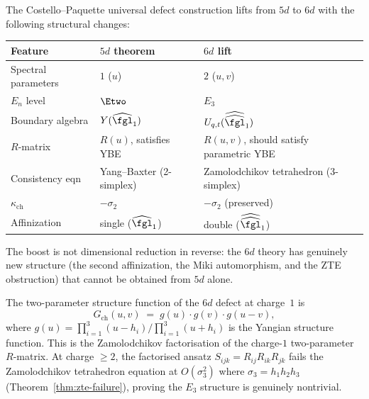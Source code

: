 \begin{conjecture}
\label{conj:cp-5d-to-6d-boost}
\ClaimStatusConjectured
The Costello--Paquette universal defect construction lifts from $5d$ to $6d$ with the following structural changes:
\begin{center}
\small
\renewcommand{\arraystretch}{1.2}
\begin{tabular}{lll}
\toprule
\textbf{Feature} & \textbf{$5d$ theorem} & \textbf{$6d$ lift} \\
\midrule
Spectral parameters & $1$ ($u$) & $2$ ($u, v$) \\
$E_n$ level & $\Etwo$ & $E_3$ \\
Boundary algebra & $Y(\widehat{\fgl}_1)$ & $U_{q,t}(\widehat{\widehat{\fgl}}_1)$ \\
$R$-matrix & $R(u)$, satisfies YBE & $R(u,v)$, should satisfy parametric YBE \\
Consistency eqn & Yang--Baxter (2-simplex) & Zamolodchikov tetrahedron (3-simplex) \\
$\kappa_{\mathrm{ch}}$ & $-\sigma_2$ & $-\sigma_2$ (preserved) \\
Affinization & single ($\widehat{\fgl}_1$) & double ($\widehat{\widehat{\fgl}}_1$) \\
\bottomrule
\end{tabular}
\end{center}
The boost is not dimensional reduction in reverse: the $6d$ theory has genuinely new structure (the second affinization, the Miki automorphism, and the ZTE obstruction) that cannot be obtained from $5d$ alone.

The two-parameter structure function of the $6d$ defect at charge~$1$ is
\begin{equation}\label{eq:cp-two-param-structure}
 G_{\mathrm{ch}}(u, v) \;=\; g(u) \cdot g(v) \cdot g(u - v),
\end{equation}
where $g(u) = \prod_{i=1}^3(u - h_i)/\prod_{i=1}^3(u + h_i)$ is the Yangian structure function. This is the Zamolodchikov factorisation of the charge-$1$ two-parameter $R$-matrix. At charge $\geq 2$, the factorised ansatz $S_{ijk} = R_{ij}R_{ik}R_{jk}$ fails the Zamolodchikov tetrahedron equation at $O(\sigma_3^2)$ where $\sigma_3 = h_1 h_2 h_3$ (Theorem~\ref{thm:zte-failure}), proving the $E_3$ structure is genuinely nontrivial.
\end{conjecture}

